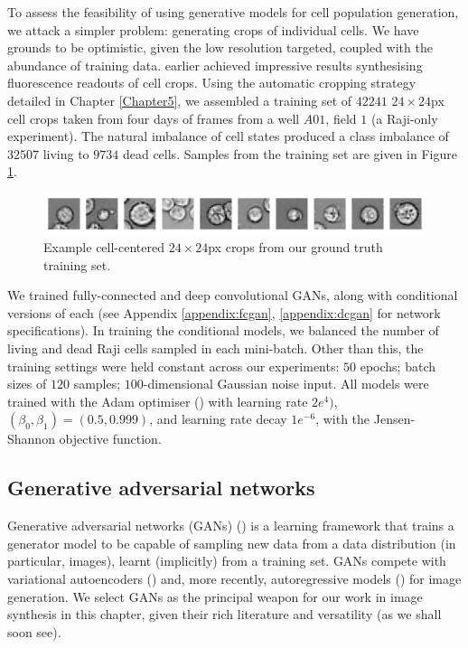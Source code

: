 To assess the feasibility of using generative models for cell population generation, we attack a simpler problem: generating crops of individual cells. We have grounds to be optimistic, given the low resolution targeted, coupled with the abundance of training data. \cite{osokin2017gans} earlier achieved impressive results synthesising fluorescence readouts of cell crops. Using the automatic cropping strategy detailed in Chapter \ref{Chapter5}, we assembled a training set of $42241$ $24 \times 24$px cell crops taken from four days of frames from a well $A01$, field $1$ (a Raji-only experiment). The natural imbalance of cell states produced a class imbalance of $32507$ living to $9734$ dead cells. Samples from the training set are given in Figure \ref{fig:reference_samples}.

\begin{figure}[h]
\centering
\includegraphics[width=\textwidth]{img/feasibility_reference_samples.pdf}
\caption{Example cell-centered $24\times 24$px crops from our ground truth training set.}
\label{fig:reference_samples}
\end{figure}

We trained fully-connected and deep convolutional GANs, along with conditional versions of each (see Appendix \ref{appendix:fcgan}, \ref{appendix:dcgan} for network specifications). In training the conditional models, we balanced the number of living and dead Raji cells sampled in each mini-batch. Other than this, the training settings were held constant across our experiments: $50$ epochs; batch sizes of $120$ samples; $100$-dimensional Gaussian noise input. All models were trained with the Adam optimiser (\cite{kingma2014adam}) with learning rate $2e^{4})$, $(\beta_0, \beta_1) = (0.5, 0.999)$, and learning rate decay $1e^{-6}$, with the Jensen-Shannon objective function.

\subsection{Generative adversarial networks}

Generative adversarial networks (GANs) (\cite{goodfellow2014generative}) is a learning framework that trains a generator model to be capable of sampling new data from a data distribution (in particular, images), learnt (implicitly) from a training set. GANs compete with variational autoencoders (\cite{kingma2013auto}) and, more recently, autoregressive models (\cite{oord2016pixel}) for image generation. We select GANs as the principal weapon for our work in image synthesis in this chapter, given their rich literature and versatility (as we shall soon see).

